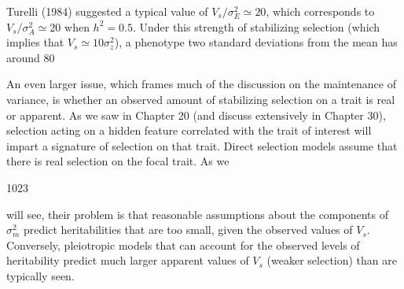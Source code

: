\documentclass{article}
\begin{document}
Turelli (1984) suggested a typical value of  $ V_s / \sigma_E^2 \simeq 20 $, which corresponds to  $ V_s / \sigma_A^2 \simeq 20 $ when  $ h^2 = 0.5 $. Under this strength of stabilizing selection (which implies that  $ V_s \simeq 10 \sigma_z^2 $), a phenotype two standard deviations from the mean has around 80%

An even larger issue, which frames much of the discussion on the maintenance of variance, is whether an observed amount of stabilizing selection on a trait is real or apparent. As we saw in Chapter 20 (and discuss extensively in Chapter 30), selection acting on a hidden feature correlated with the trait of interest will impart a signature of selection on that trait. Direct selection models assume that there is real selection on the focal trait. As we

1023

will see, their problem is that reasonable assumptions about the components of  $ \sigma_{m}^{2} $ predict heritabilities that are too small, given the observed values of  $ V_{s} $. Conversely, pleiotropic models that can account for the observed levels of heritability predict much larger apparent values of  $ V_{s} $ (weaker selection) than are typically seen.
\end{document}
